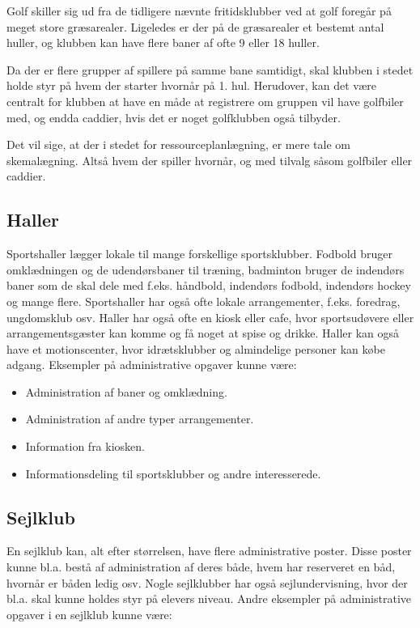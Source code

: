 Golf skiller sig ud fra de tidligere nævnte fritidsklubber ved at golf foregår på meget store græsarealer. Ligeledes er der på de græsarealer et bestemt antal huller, og klubben kan have flere baner af ofte 9 eller 18 huller. 

Da der er flere grupper af spillere på samme bane samtidigt, skal klubben i stedet holde styr på hvem der starter hvornår på 1. hul. Herudover, kan det være centralt for klubben at have en måde at registrere om gruppen vil have golfbiler med, og endda caddier, hvis det er noget golfklubben også tilbyder.

Det vil sige, at der i stedet for ressourceplanlægning, er mere tale om skemalægning. Altså hvem der spiller hvornår, og med tilvalg såsom golfbiler eller caddier.


\subsection{Haller}

Sportshaller lægger lokale til mange forskellige sportsklubber. Fodbold bruger omklædningen og de udendørsbaner til træning, badminton bruger de indendørs baner som de skal dele med f.eks. håndbold, indendørs fodbold, indendørs hockey og mange flere. Sportshaller har også ofte lokale arrangementer, f.eks. foredrag, ungdomsklub osv. 
Haller har også ofte en kiosk eller cafe, hvor sportsudøvere eller arrangementsgæster kan komme og få noget at spise og drikke. 
Haller kan også have et motionscenter, hvor idrætsklubber og almindelige personer kan købe adgang\citep{spt_hal}.
Eksempler på administrative opgaver kunne være:

\begin{itemize}
\item Administration af baner og omklædning.
\item Administration af andre typer arrangementer.
\item Information fra kiosken.
\item Informationsdeling til sportsklubber og andre interesserede.
\end{itemize}

\subsection{Sejlklub}

En sejlklub kan, alt efter størrelsen, have flere administrative poster. Disse poster kunne bl.a. bestå af administration af deres både, hvem har reserveret en båd, hvornår er båden ledig osv. Nogle sejlklubber har også sejlundervisning, hvor der bl.a. skal kunne holdes styr på elevers niveau. Andre eksempler på administrative opgaver i en sejlklub kunne være: 

